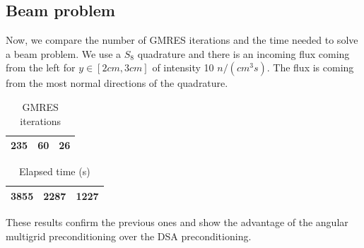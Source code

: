 \subsection{Beam problem}
Now, we compare the number of GMRES iterations and the time needed to solve a
beam problem. We use a $S_8$ quadrature and there is an incoming flux coming
from the left for $y\in [2cm,3cm]$ of intensity 10 $n/(cm^3s)$. The flux is
coming from the most normal directions of the quadrature.
\begin{table}[H]
\begin{center}
\begin{tabular}{|c|c|c|}
\hline
235 & 60 & 26 \\
\hline
\end{tabular}
\caption{GMRES iterations}
\end{center}
\end{table}

\begin{table}[H]
\begin{center}
\begin{tabular}{|c|c|c|}
\hline
3855 & 2287 & 1227\\
\hline
\end{tabular}
\caption{Elapsed time (s)}
\end{center}
\end{table}
These results confirm the previous ones and show the advantage of the angular
multigrid preconditioning over the DSA preconditioning.


